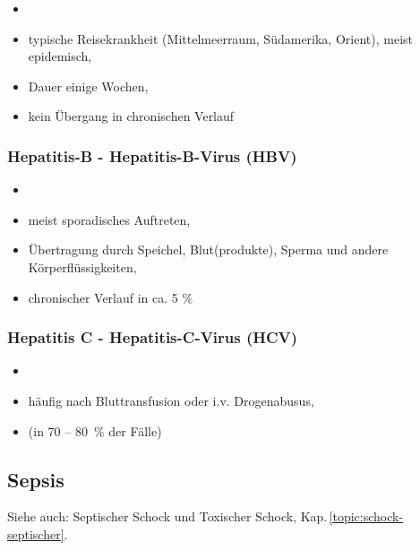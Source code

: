 \begin{itemize}
\item {}  
\item typische Reisekrankheit (Mittelmeerraum, S\"udamerika, Orient),
meist epidemisch, 
\item Dauer einige Wochen, 
\item kein \"Ubergang in chronischen Verlauf
\end{itemize}


\subsubsection{Hepatitis-B - Hepatitis-B-Virus (HBV)}

\begin{itemize}
\item {} 
\item meist sporadisches Auftreten, 
\item \"Ubertragung durch Speichel, Blut(produkte), Sperma und andere
K\"orperfl\"ussigkeiten, 
\item chronischer Verlauf in ca. 5 \%
\end{itemize}


\subsubsection{Hepatitis C - Hepatitis-C-Virus (HCV)}

\begin{itemize}
\item {} 
\item h\"aufig nach Bluttransfusion oder i.v. Drogenabusus, 
\item {} (in 70 -- 80~\% der
F\"alle)
\end{itemize}




\subsection{Sepsis}
\label{topic:sepsis}

Siehe auch: Septischer Schock und Toxischer Schock,
Kap.\,\ref{topic:schock-septischer}.

